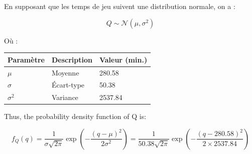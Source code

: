 \documentclass[11pt]{article}
\makeatletter
\newcommand{\boxspacing}{\kern\kvtcb@left@rule\kern\kvtcb@boxsep}
\newcommand{\prompt}[4]{
        {\ttfamily\llap{{\color{#2}[#3]:\hspace{3pt}#4}}\vspace{-\baselineskip}}
    }
\makeatother
\begin{document}
En supposant que les temps de jeu suivent une distribution normale, on a
:

\[Q \sim \mathcal{N}(\mu, \sigma^2)\]

Où :

\begin{longtable}[]{@{}lll@{}}
\toprule\noalign{}
Paramètre & Description & Valeur (min.) \\
\midrule\noalign{}
\endhead
\bottomrule\noalign{}
\endlastfoot
\(\mu\) & Moyenne & 280.58 \\
\(\sigma\) & Écart-type & 50.38 \\
\(\sigma^2\) & Variance & 2537.84 \\
\end{longtable}

Thus, the probability density function of Q is:

\[f_Q(q) = \frac{1}{\sigma\sqrt{2\pi}} \exp\left(-\frac{(q-\mu)^2}{2\sigma^2}\right) = \frac{1}{50.38\sqrt{2\pi}} \exp\left(-\frac{(q-280.58)^2}{2 \times 2537.84}\right)\]

    

    \begin{tcolorbox}[breakable, size=fbox, boxrule=1pt, pad at break*=1mm,colback=cellbackground, colframe=cellborder]
\prompt{In}{incolor}{ }{\boxspacing}
\begin{Verbatim}[commandchars=\\\{\}]

\end{Verbatim}
\end{tcolorbox}

    \begin{tcolorbox}[breakable, size=fbox, boxrule=1pt, pad at break*=1mm,colback=cellbackground, colframe=cellborder]
\prompt{In}{incolor}{ }{\boxspacing}
\begin{Verbatim}[commandchars=\\\{\}]

\end{Verbatim}
\end{tcolorbox}


    
    
    
\end{document}
